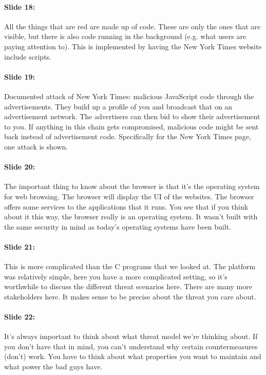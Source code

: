 \documentclass[10pt,a4paper]{report}
\begin{document}
\paragraph{Slide 18:} All the things that are red are made up of code. These are only the ones that are visible, but there is also code running in the background (e.g. what users are paying attention to). This is implemented by having the New York Times website include scripts. 

\paragraph{Slide 19:} Documented attack of New York Times: malicious JavaScript code through the advertisements. They build up a profile of you and broadcast that on an advertisement network. The advertisers can then bid to show their advertisement to you. If anything in this chain gets compromised, malicious code might be sent back instead of advertisement code. Specifically for the New York Times page, one attack is shown.

\paragraph{Slide 20:} The important thing to know about the browser is that it's the operating system for web browsing. The browser will display the UI of the websites. The browser offers some services to the applications that it runs. You see that if you think about it this way, the browser really is an operating system. It wasn't built with the same security in mind as today's operating systems have been built.

\paragraph{Slide 21:} This is more complicated than the C programs that we looked at. The platform was relatively simple, here you have a more complicated setting, so it's worthwhile to discuss the different threat scenarios here. There are many more stakeholders here. It makes sense to be precise about the threat you care about.

\paragraph{Slide 22:} It's always important to think about what threat model we're thinking about. If you don't have that in mind, you can't understand why certain countermeasures (don't) work. You have to think about what properties you want to maintain and what power the bad guys have.
\end{document}
